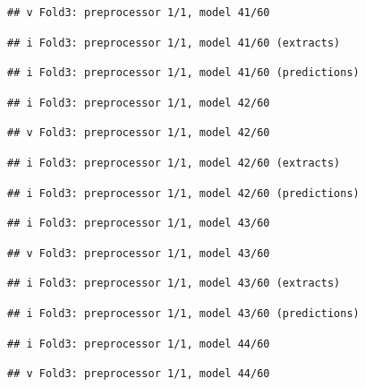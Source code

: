 \documentclass[
]{article}
\begin{document}
\begin{verbatim}
## v Fold3: preprocessor 1/1, model 41/60
\end{verbatim}

\begin{verbatim}
## i Fold3: preprocessor 1/1, model 41/60 (extracts)
\end{verbatim}

\begin{verbatim}
## i Fold3: preprocessor 1/1, model 41/60 (predictions)
\end{verbatim}

\begin{verbatim}
## i Fold3: preprocessor 1/1, model 42/60
\end{verbatim}

\begin{verbatim}
## v Fold3: preprocessor 1/1, model 42/60
\end{verbatim}

\begin{verbatim}
## i Fold3: preprocessor 1/1, model 42/60 (extracts)
\end{verbatim}

\begin{verbatim}
## i Fold3: preprocessor 1/1, model 42/60 (predictions)
\end{verbatim}

\begin{verbatim}
## i Fold3: preprocessor 1/1, model 43/60
\end{verbatim}

\begin{verbatim}
## v Fold3: preprocessor 1/1, model 43/60
\end{verbatim}

\begin{verbatim}
## i Fold3: preprocessor 1/1, model 43/60 (extracts)
\end{verbatim}

\begin{verbatim}
## i Fold3: preprocessor 1/1, model 43/60 (predictions)
\end{verbatim}

\begin{verbatim}
## i Fold3: preprocessor 1/1, model 44/60
\end{verbatim}

\begin{verbatim}
## v Fold3: preprocessor 1/1, model 44/60
\end{verbatim}
\end{document}
